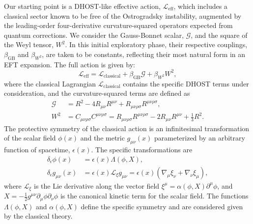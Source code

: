 \documentclass[twocolumn]{aastex631}
\begin{document}
Our starting point is a DHOST-like effective action, $\mathcal{L}_{\text{eff}}$, which includes a classical sector known to be free of the Ostrogradsky instability, augmented by the leading-order four-derivative curvature-squared operators expected from quantum corrections. We consider the Gauss-Bonnet scalar, $\mathcal{G}$, and the square of the Weyl tensor, $W^2$. In this initial exploratory phase, their respective couplings, $\beta_{\text{GB}}$ and $\beta_{W^2}$, are taken to be constants, reflecting their most natural form in an EFT expansion. The full action is given by:
\begin{equation}
\mathcal{L}_{\text{eff}} = \mathcal{L}_{\text{classical}} + \beta_{\text{GB}} \mathcal{G} + \beta_{W^2} W^2,
\end{equation}
where the classical Lagrangian $\mathcal{L}_{\text{classical}}$ contains the specific DHOST terms under consideration, and the curvature-squared terms are defined as
\begin{align}
\mathcal{G} &= R^2 - 4 R_{\mu\nu}R^{\mu\nu} + R_{\mu\nu\rho\sigma}R^{\mu\nu\rho\sigma}, \\
W^2 &= C_{\mu\nu\rho\sigma}C^{\mu\nu\rho\sigma} = R_{\mu\nu\rho\sigma}R^{\mu\nu\rho\sigma} - 2 R_{\mu\nu}R^{\mu\nu} + \frac{1}{3}R^2.
\end{align}
The protective symmetry of the classical action is an infinitesimal transformation of the scalar field $\phi(x)$ and the metric $g_{\mu\nu}(x)$ parameterized by an arbitrary function of spacetime, $\epsilon(x)$. The specific transformations are
\begin{align}
\delta_\epsilon \phi(x) &= \epsilon(x) \Lambda(\phi, X), \label{eq:phi_transf} \\
\delta_\epsilon g_{\mu\nu}(x) &= \epsilon(x) \mathcal{L}_{\xi} g_{\mu\nu} = \epsilon(x) \left( \nabla_\mu \xi_\nu + \nabla_\nu \xi_\mu \right), \label{eq:g_transf}
\end{align}
where $\mathcal{L}_{\xi}$ is the Lie derivative along the vector field $\xi^\mu = \alpha(\phi, X) \partial^\mu\phi$, and $X = -\frac{1}{2}g^{\mu\nu}\partial_\mu\phi\partial_\nu\phi$ is the canonical kinetic term for the scalar field. The functions $\Lambda(\phi, X)$ and $\alpha(\phi, X)$ define the specific symmetry and are considered given by the classical theory.
\end{document}
